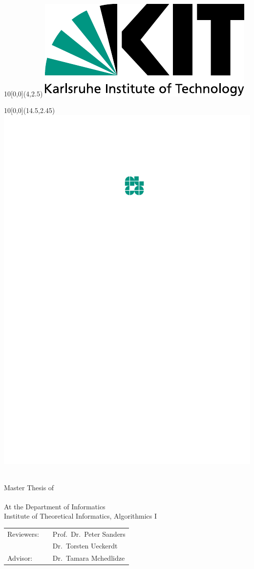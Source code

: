 \makeatletter
\begin{titlepage}


\begin{textblock}{10}[0,0](4,2.5)
\includegraphics[width=.3\textwidth]{Resources/Logos/KIT.pdf}
\end{textblock}

\begin{textblock}{10}[0,0](14.5,2.45)
\includegraphics[width=.15\textwidth]{Resources/Logos/Algo.pdf}
\end{textblock}


\vspace*{3.75cm}

\begin{center}
  \Huge{\@title}
  \vspace*{2.25cm}\\
  \Large{Master Thesis of}\\
  \vspace*{1cm}
  \huge{\@author}\\
  \vspace*{1cm}
  \Large{At the Department of Informatics}\\
  \Large{Institute of Theoretical Informatics, Algorithmics I}\\
\end{center}

\vspace*{1cm}

\begin{center}
\begin{Large}
\begin{tabular}[ht]{l c l}
  Reviewers: & \hfill & Prof.~Dr.~Peter Sanders\\
  & \hfill & Dr.~Torsten Ueckerdt\\
  Advisor: & \hfill & Dr.~Tamara Mchedlidze
\end{tabular}
\end{Large}
\end{center}


\end{titlepage}
